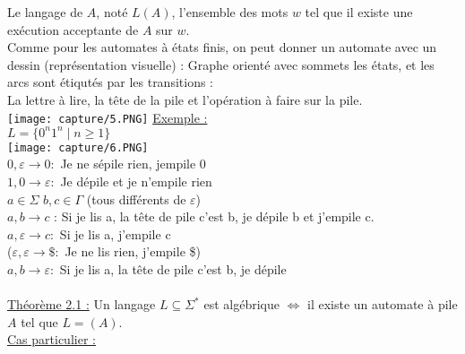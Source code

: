 \documentclass{article}
\begin{document}
    Le langage de $A$, noté $L(A)$, l'ensemble des mots $w$ tel que il existe une exécution acceptante de $A$ sur $w$. \\
    Comme pour les automates à états finis, on peut donner un automate avec un dessin (représentation visuelle) : Graphe orienté avec sommets les états, et les arcs sont étiqutés par les transitions : \\ 
    La lettre à lire, la tête de la pile et l'opération à faire sur la pile. \\
    \texttt{[image: capture/5.PNG]}
    \underline{Exemple : } \\
    $L=\{0^n1^n \mid n \ge 1\}$ \\
    \texttt{[image: capture/6.PNG]} \\ 
    \newpage
    $0,\varepsilon \rightarrow 0 : $ Je ne sépile rien, jempile 0 \\ 
    $1,0 \rightarrow \varepsilon : $ Je dépile et je n'empile rien \\ 
    $a \in \Sigma$ $b,c \in \Gamma$ (tous différents de $\varepsilon$) \\ 
    $a,b \rightarrow c$ : Si je lis a, la tête de pile c'est b, je dépile b et j'empile c. \\ 
    $a, \varepsilon \rightarrow c : $ Si je lis a, j'empile c \\ 
    ($\varepsilon, \varepsilon \rightarrow \$ : $ Je ne lis rien, j'empile \$) \\ 
    $a,b \rightarrow \varepsilon : $ Si je lis a, la tête de pile c'est b, je dépile \\ 
    \\
    \underline{Théorème 2.1 :} Un langage $L \subseteq \Sigma^*$ est algébrique $\Leftrightarrow$ il existe un automate à pile $A$ tel que $L=(A)$. \\ 
    \underline{Cas particulier :} \\ 
\end{document}
